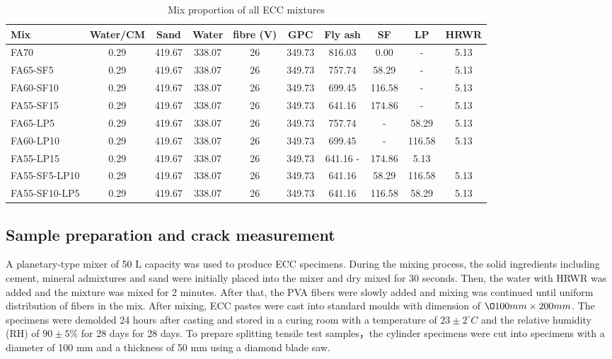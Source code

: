\documentclass[11pt]{article}
\begin{document}
	
	\begin{table}[!tp]
		\centering
		\caption{Mix proportion of all ECC mixtures}
		\begin{tabular}{lccccccccc}
			\toprule
			Mix&	Water/CM	&Sand&	Water&	fibre (V)&	GPC	&Fly ash&	SF&	LP&	HRWR
			\\
			\midrule
			FA70&	0.29&	419.67&	338.07	&26	&349.73&	816.03	&0.00&	-	&5.13
			\\
			FA65-SF5&	0.29&	419.67&	338.07&	26	&349.73	&757.74&	58.29&	-&	5.13
			\\
			FA60-SF10	&0.29&	419.67&	338.07&26&	349.73&	699.45&	116.58	&-&	5.13
			\\
			FA55-SF15&	0.29&	419.67&	338.07&	26&	349.73&	641.16&	174.86	&-&	5.13
			\\
			FA65-LP5&	0.29&	419.67	&338.07&	26	&349.73	&757.74	&-	&58.29&	5.13
			\\
			FA60-LP10&	0.29&	419.67&	338.07&	26&	349.73	&699.45	&-	&116.58	&5.13
			\\
			FA55-LP15&	0.29&	419.67&	338.07&	26&	349.73	&641.16	-&	174.86	&5.13
			\\
			FA55-SF5-LP10&	0.29&	419.67&	338.07	&26&	349.73&	641.16	&58.29	&116.58	&5.13
			\\
			FA55-SF10-LP5	&0.29	&419.67	&338.07	&26	&349.73	&641.16	&116.58	&58.29	&5.13
			\\
			\bottomrule
		\end{tabular}
		\label{mx}
	\end{table}
	

\subsection{Sample preparation and crack measurement}
	\label{experi}
	A planetary-type mixer of 50 L capacity was used to produce ECC specimens. During the mixing process, the solid ingredients including cement, mineral admixtures and sand were initially placed into the mixer and dry mixed for 30 seconds. Then, the water with HRWR was added and the mixture was mixed for 2 minutes. After that, the PVA fibers were slowly added and mixing was continued until uniform distribution of fibers in the mix. After mixing, ECC pastes were cast into standard moulds with dimension of $\O 100mm \times 200mm$. The specimens were demolded 24 hours after casting and stored in a curing room with a temperature of $23 \pm 2^\circ C$ and the relative humidity (RH) of $90 \pm 5\%$ for 28 days for 28 days. To prepare splitting tensile test samples，the cylinder specimens were cut into specimens with a diameter of 100 mm and a thickness of 50 mm using a diamond blade saw.
\end{document}
